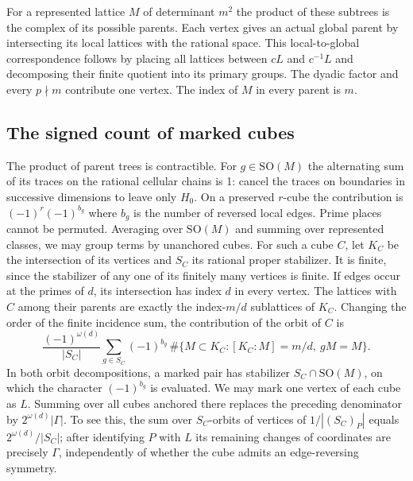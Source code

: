 For a represented lattice $M$ of determinant $m^2$ the product of these
subtrees is the complex of its possible parents. Each vertex gives an
actual global parent by intersecting its local lattices with the rational
space. This local-to-global correspondence follows by placing
all lattices between $cL$ and $c^{-1}L$ and decomposing their finite
quotient into its primary groups. The dyadic factor and every $p\nmid m$
contribute one vertex. The index of $M$ in every parent is $m$.

\subsection*{The signed count of marked cubes}
The product of parent trees is contractible. For $g\in\mathrm{SO}(M)$
the alternating sum of its traces on the rational cellular chains is 1:
cancel the traces on boundaries in successive dimensions to leave
only $H_0$. On a preserved $r$-cube the contribution is
$(-1)^r(-1)^{b_g}$ where $b_g$ is the number of reversed local edges.
Prime places cannot be permuted. Averaging over $\mathrm{SO}(M)$
and summing over represented classes, we may group terms by unanchored
cubes. For such a cube $C$, let $K_C$ be the intersection of its
vertices and $S_C$ its rational proper stabilizer. It is finite, since the stabilizer of any one
of its finitely many vertices is finite. If edges occur at the primes
of $d$, its intersection has index $d$ in every vertex. The lattices
with $C$ among their parents are exactly the index-$m/d$ sublattices
of $K_C$. Changing the order of the finite incidence sum, the contribution
of the orbit of $C$ is
\[
 \frac{(-1)^{\omega(d)}}{|S_C|}
 \sum_{g\in S_C}(-1)^{b_g}\,
 \#\{M\subset K_C:[K_C:M]=m/d,\ gM=M\}.
\]
In both orbit decompositions, a marked pair has stabilizer
$S_C\cap\mathrm{SO}(M)$, on which the character $(-1)^{b_g}$ is
evaluated. We may mark one vertex of each cube as $L$.
Summing over all cubes anchored there replaces the preceding denominator
by $2^{\omega(d)}|\Gamma|$. To see this, the sum over $S_C$-orbits
of vertices of $1/|(S_C)_P|$ equals $2^{\omega(d)}/|S_C|$;
after identifying $P$ with $L$ its remaining changes of coordinates
are precisely $\Gamma$, independently of whether the cube admits an
edge-reversing symmetry.

